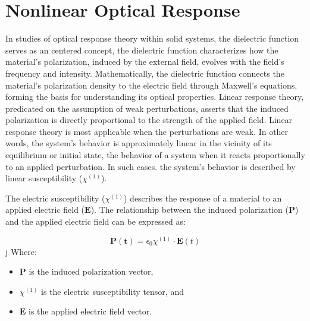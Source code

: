 \section{Nonlinear Optical Response}
In studies of optical response theory within solid systems, the dielectric function serves as an centered concept, the dielectric function characterizes how the material's polarization, induced by the external field, evolves with the field's frequency and intensity. Mathematically, the dielectric function connects the material's polarization density to the electric field through Maxwell's equations, forming the basis for understanding its optical properties. Linear response theory, predicated on the assumption of weak perturbations, asserts that the induced polarization is directly proportional to the strength of the applied field.
Linear response theory is most applicable when the perturbations are weak. In other words, the system's behavior is approximately linear in the vicinity of its equilibrium or initial state, the behavior of a system when it reacts proportionally to an applied perturbation.
In such cases. the system's behavior is described by linear susceptibility ($\chi^{(1)}$).

The electric susceptibility ($\chi^{(1)}$) describes the response of a material to an applied electric field ($\mathbf{E}$). The relationship between the induced polarization ($\mathbf{P}$) and the applied electric field can be expressed as:

\[
	\mathbf{P(t)} =\epsilon_0 \chi^{(1)} \cdot \mathbf{E}(t)
\]
j
Where:
\begin{itemize}
	\item $\mathbf{P}$ is the induced polarization vector,
	\item $\chi^{(1)}$ is the electric susceptibility tensor, and
	\item $\mathbf{E}$ is the applied electric field vector.
\end{itemize}

